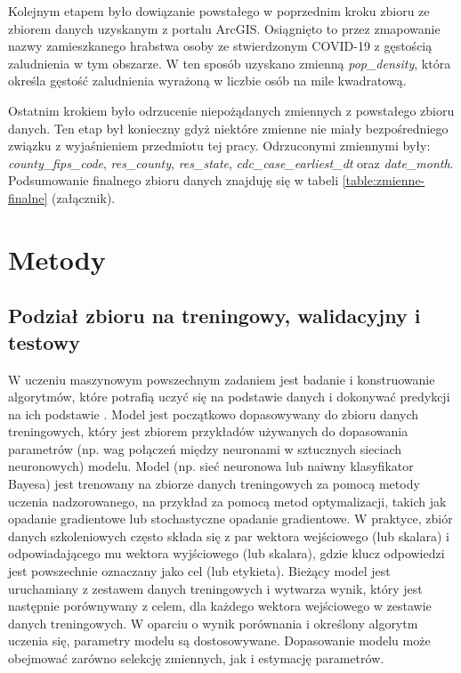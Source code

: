 \documentclass[polish, twoside, 12pt, a4paper]{article}
\theoremstyle{definition}
\theoremstyle{plain}
\theoremstyle{remark}
\begin{document}
Kolejnym etapem było dowiązanie powstałego w poprzednim kroku zbioru ze zbiorem danych uzyskanym z portalu ArcGIS. Osiągnięto to przez zmapowanie nazwy zamieszkanego hrabstwa osoby ze stwierdzonym COVID-19 z gęstością zaludnienia w tym obszarze. W ten sposób uzyskano zmienną \emph{pop\_density}, która określa gęstość zaludnienia wyrażoną w liczbie osób na mile kwadratową.

Ostatnim krokiem było odrzucenie niepożądanych zmiennych z powstałego zbioru danych. Ten etap był konieczny gdyż niektóre zmienne nie miały bezpośredniego związku z wyjaśnieniem przedmiotu tej pracy. Odrzuconymi zmiennymi były:  \emph{county\_fips\_code},  \emph{res\_county}, \emph{res\_state}, \emph{cdc\_case\_earliest\_dt} oraz \emph{date\_month}. Podsumowanie finalnego zbioru danych znajduję się w tabeli \ref{table:zmienne-finalne} (załącznik).


\clearpage
\section{Metody}


\subsection{Podział zbioru na treningowy, walidacyjny i testowy}
\label{chapter:train-test-split}
W uczeniu maszynowym powszechnym zadaniem jest badanie i konstruowanie algorytmów, które potrafią uczyć się na podstawie danych i dokonywać predykcji na ich podstawie \cite{kohavi1998}. Model jest początkowo dopasowywany do zbioru danych treningowych, który jest zbiorem przykładów używanych do dopasowania parametrów (np. wag połączeń między neuronami w sztucznych sieciach neuronowych) modelu. Model (np. sieć neuronowa lub naiwny klasyfikator Bayesa) jest trenowany na zbiorze danych treningowych za pomocą metody uczenia nadzorowanego, na przykład za pomocą metod optymalizacji, takich jak opadanie gradientowe lub stochastyczne opadanie gradientowe. W praktyce, zbiór danych szkoleniowych często składa się z par wektora wejściowego (lub skalara) i odpowiadającego mu wektora wyjściowego (lub skalara), gdzie klucz odpowiedzi jest powszechnie oznaczany jako cel (lub etykieta). Bieżący model jest uruchamiany z zestawem danych treningowych i wytwarza wynik, który jest następnie porównywany z celem, dla każdego wektora wejściowego w zestawie danych treningowych. W oparciu o wynik porównania i określony algorytm uczenia się, parametry modelu są dostosowywane. Dopasowanie modelu może obejmować zarówno selekcję zmiennych, jak i estymację parametrów.
\end{document}
